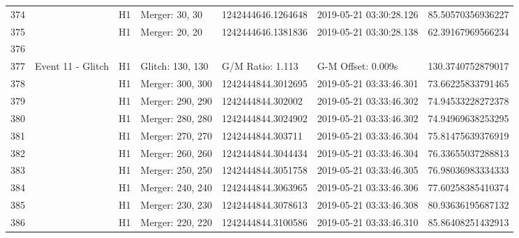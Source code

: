 \begin{longtable}{lllllll}
374  &                                                    &       H1 &    Merger: 30, 30 &  1242444646.1264648 &  2019-05-21 03:30:28.126 &   85.50570356936227 \\
375  &                                                    &       H1 &    Merger: 20, 20 &  1242444646.1381836 &  2019-05-21 03:30:28.138 &   62.39167969566234 \\
376  &                                                    &          &                   &                     &                          &                     \\
377  &                                  Event 11 - Glitch &       H1 &  Glitch: 130, 130 &    G/M Ratio: 1.113 &       G-M Offset: 0.009s &   130.3740752879017 \\
378  &                                                    &       H1 &  Merger: 300, 300 &  1242444844.3012695 &  2019-05-21 03:33:46.301 &   73.66225833791465 \\
379  &                                                    &       H1 &  Merger: 290, 290 &   1242444844.302002 &  2019-05-21 03:33:46.302 &   74.94533228272378 \\
380  &                                                    &       H1 &  Merger: 280, 280 &  1242444844.3024902 &  2019-05-21 03:33:46.302 &   74.94969638253295 \\
381  &                                                    &       H1 &  Merger: 270, 270 &   1242444844.303711 &  2019-05-21 03:33:46.304 &   75.81475639376919 \\
382  &                                                    &       H1 &  Merger: 260, 260 &  1242444844.3044434 &  2019-05-21 03:33:46.304 &   76.33655037288813 \\
383  &                                                    &       H1 &  Merger: 250, 250 &  1242444844.3051758 &  2019-05-21 03:33:46.305 &   76.98036983334333 \\
384  &                                                    &       H1 &  Merger: 240, 240 &  1242444844.3063965 &  2019-05-21 03:33:46.306 &   77.60258385410374 \\
385  &                                                    &       H1 &  Merger: 230, 230 &  1242444844.3078613 &  2019-05-21 03:33:46.308 &   80.93636195687132 \\
386  &                                                    &       H1 &  Merger: 220, 220 &  1242444844.3100586 &  2019-05-21 03:33:46.310 &   85.86408251432913 \\

\end{longtable}
